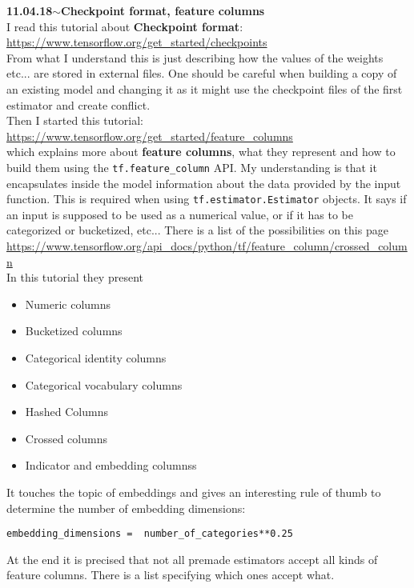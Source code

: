 \documentclass[11pt,a4paper]{article}
\newenvironment{loggentry}[2]%
{\noindent\textbf{#1}\hspace{1cm}$\mathbf{\sim}$\text{ }\textbf{#2}\\}{\vspace{0.5cm}}
\begin{document}
\begin{loggentry}{11.04.18}{Checkpoint format, feature columns}
I read this tutorial about \textbf{Checkpoint format}:\\
\url{https://www.tensorflow.org/get_started/checkpoints}\\
From what I understand this is just describing how the values of the weights etc... are stored in external files. One should be careful when building a copy of an existing model and changing it as it might use the checkpoint files of the first estimator and create conflict.\\
Then I started this tutorial:\\
\url{https://www.tensorflow.org/get_started/feature_columns}\\
which explains more about \textbf{feature columns}, what they represent and how to build them using the \texttt{tf.feature\_column} API. My understanding is that it encapsulates inside the model information about the data provided by the input function. This is required when using \texttt{tf.estimator.Estimator} objects. It says if an input is supposed to be used as a numerical value, or if it has to be categorized or bucketized, etc... There is a list of the possibilities on this page\\
\url{https://www.tensorflow.org/api_docs/python/tf/feature_column/crossed_column}\\
In this tutorial they present
\begin{itemize}
\item Numeric columns
\item Bucketized columns
\item Categorical identity columns
\item Categorical vocabulary columns\\
\item Hashed Columns
\item Crossed columns
\item Indicator and embedding columnss
\end{itemize}
It touches the topic of embeddings and gives an interesting rule of thumb to determine the number of embedding dimensions:\\
\begin{verbatim}
embedding_dimensions =  number_of_categories**0.25
\end{verbatim}
At the end it is precised that not all premade estimators accept all kinds of feature columns. There is a list specifying which ones accept what.
\end{loggentry}
\end{document}
